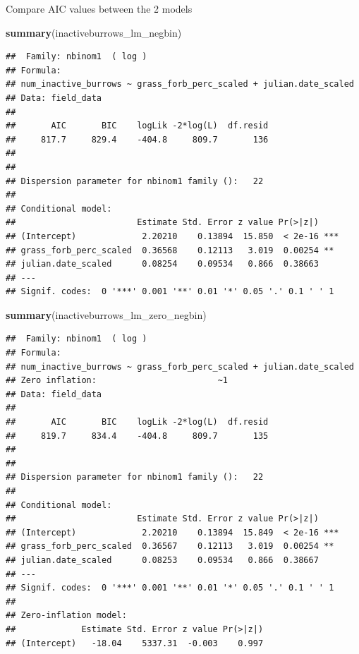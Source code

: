 \documentclass[
]{article}
\newenvironment{Shaded}{\begin{snugshade}}{\end{snugshade}}
\newcommand{\FunctionTok}[1]{\textcolor[rgb]{0.13,0.29,0.53}{\textbf{#1}}}
\newcommand{\NormalTok}[1]{#1}
\begin{document}
Compare AIC values between the 2 models

\begin{Shaded}
\begin{Highlighting}[]
\FunctionTok{summary}\NormalTok{(inactiveburrows\_lm\_negbin)}
\end{Highlighting}
\end{Shaded}

\begin{verbatim}
##  Family: nbinom1  ( log )
## Formula:          
## num_inactive_burrows ~ grass_forb_perc_scaled + julian.date_scaled
## Data: field_data
## 
##       AIC       BIC    logLik -2*log(L)  df.resid 
##     817.7     829.4    -404.8     809.7       136 
## 
## 
## Dispersion parameter for nbinom1 family ():   22 
## 
## Conditional model:
##                        Estimate Std. Error z value Pr(>|z|)    
## (Intercept)             2.20210    0.13894  15.850  < 2e-16 ***
## grass_forb_perc_scaled  0.36568    0.12113   3.019  0.00254 ** 
## julian.date_scaled      0.08254    0.09534   0.866  0.38663    
## ---
## Signif. codes:  0 '***' 0.001 '**' 0.01 '*' 0.05 '.' 0.1 ' ' 1
\end{verbatim}

\begin{Shaded}
\begin{Highlighting}[]
\FunctionTok{summary}\NormalTok{(inactiveburrows\_lm\_zero\_negbin)}
\end{Highlighting}
\end{Shaded}

\begin{verbatim}
##  Family: nbinom1  ( log )
## Formula:          
## num_inactive_burrows ~ grass_forb_perc_scaled + julian.date_scaled
## Zero inflation:                        ~1
## Data: field_data
## 
##       AIC       BIC    logLik -2*log(L)  df.resid 
##     819.7     834.4    -404.8     809.7       135 
## 
## 
## Dispersion parameter for nbinom1 family ():   22 
## 
## Conditional model:
##                        Estimate Std. Error z value Pr(>|z|)    
## (Intercept)             2.20210    0.13894  15.849  < 2e-16 ***
## grass_forb_perc_scaled  0.36567    0.12113   3.019  0.00254 ** 
## julian.date_scaled      0.08253    0.09534   0.866  0.38667    
## ---
## Signif. codes:  0 '***' 0.001 '**' 0.01 '*' 0.05 '.' 0.1 ' ' 1
## 
## Zero-inflation model:
##             Estimate Std. Error z value Pr(>|z|)
## (Intercept)   -18.04    5337.31  -0.003    0.997
\end{verbatim}
\end{document}

